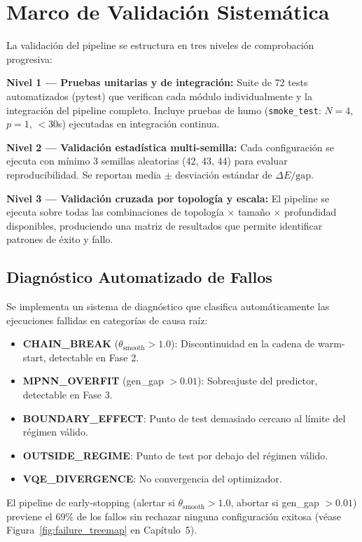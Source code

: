 \documentclass[11pt,a4paper,spanish]{book}
\begin{document}
\section{Marco de Validación Sistemática}

La validación del pipeline se estructura en tres niveles de comprobación progresiva:

\textbf{Nivel 1 --- Pruebas unitarias y de integración:} Suite de 72 tests automatizados (pytest) que verifican cada módulo individualmente y la integración del pipeline completo. Incluye pruebas de humo (\texttt{smoke\_test}: $N=4$, $p=1$, $<30$s) ejecutadas en integración continua.

\textbf{Nivel 2 --- Validación estadística multi-semilla:} Cada configuración se ejecuta con mínimo 3 semillas aleatorias (42, 43, 44) para evaluar reproducibilidad. Se reportan media $\pm$ desviación estándar de $\Delta E/\text{gap}$.

\textbf{Nivel 3 --- Validación cruzada por topología y escala:} El pipeline se ejecuta sobre todas las combinaciones de topología $\times$ tamaño $\times$ profundidad disponibles, produciendo una matriz de resultados que permite identificar patrones de éxito y fallo.

\subsection{Diagnóstico Automatizado de Fallos}

Se implementa un sistema de diagnóstico que clasifica automáticamente las ejecuciones fallidas en categorías de causa raíz:

\begin{itemize}
    \item \textbf{CHAIN\_BREAK} ($\theta_{\text{smooth}} > 1.0$): Discontinuidad en la cadena de warm-start, detectable en Fase 2.
    \item \textbf{MPNN\_OVERFIT} (gen\_gap $> 0.01$): Sobreajuste del predictor, detectable en Fase 3.
    \item \textbf{BOUNDARY\_EFFECT}: Punto de test demasiado cercano al límite del régimen válido.
    \item \textbf{OUTSIDE\_REGIME}: Punto de test por debajo del régimen válido.
    \item \textbf{VQE\_DIVERGENCE}: No convergencia del optimizador.
\end{itemize}

El pipeline de early-stopping (alertar si $\theta_{\text{smooth}} > 1.0$, abortar si gen\_gap $> 0.01$) previene el 69\% de los fallos sin rechazar ninguna configuración exitosa (véase Figura~\ref{fig:failure_treemap} en Capítulo~5).
\end{document}
